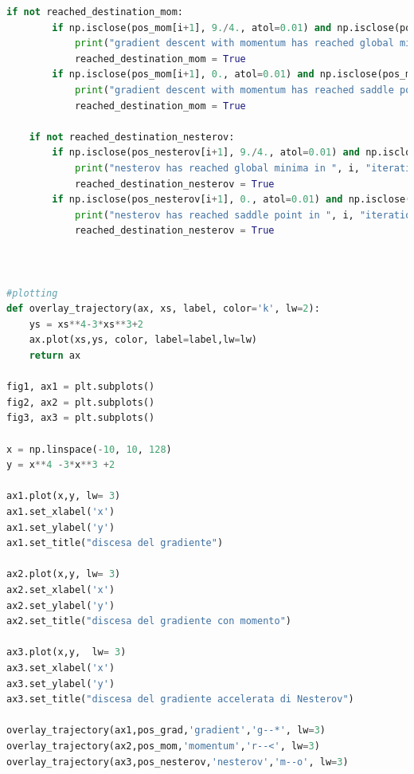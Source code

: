\documentclass{article}
\begin{document}
\begin{lstlisting}[language = Python]
    if not reached_destination_mom:
        if np.isclose(pos_mom[i+1], 9./4., atol=0.01) and np.isclose(pos_mom[i], 9./4., atol=0.01):
            print("gradient descent with momentum has reached global minima in ", i, "iterations")
            reached_destination_mom = True
        if np.isclose(pos_mom[i+1], 0., atol=0.01) and np.isclose(pos_mom[i], 0., atol=0.01):
            print("gradient descent with momentum has reached saddle point in ", i, "iterations")
            reached_destination_mom = True

    if not reached_destination_nesterov:
        if np.isclose(pos_nesterov[i+1], 9./4., atol=0.01) and np.isclose(pos_nesterov[i], 9./4., atol=0.01):
            print("nesterov has reached global minima in ", i, "iterations")
            reached_destination_nesterov = True
        if np.isclose(pos_nesterov[i+1], 0., atol=0.01) and np.isclose(pos_nesterov[i], 0., atol=0.01):
            print("nesterov has reached saddle point in ", i, "iterations")
            reached_destination_nesterov = True



#plotting
def overlay_trajectory(ax, xs, label, color='k', lw=2):
    ys = xs**4-3*xs**3+2
    ax.plot(xs,ys, color, label=label,lw=lw)
    return ax

fig1, ax1 = plt.subplots()
fig2, ax2 = plt.subplots()
fig3, ax3 = plt.subplots()

x = np.linspace(-10, 10, 128)
y = x**4 -3*x**3 +2

ax1.plot(x,y, lw= 3)
ax1.set_xlabel('x')
ax1.set_ylabel('y')
ax1.set_title("discesa del gradiente")

ax2.plot(x,y, lw= 3)
ax2.set_xlabel('x')
ax2.set_ylabel('y')
ax2.set_title("discesa del gradiente con momento")

ax3.plot(x,y,  lw= 3)
ax3.set_xlabel('x')
ax3.set_ylabel('y')
ax3.set_title("discesa del gradiente accelerata di Nesterov")

overlay_trajectory(ax1,pos_grad,'gradient','g--*', lw=3)
overlay_trajectory(ax2,pos_mom,'momentum','r--<', lw=3)
overlay_trajectory(ax3,pos_nesterov,'nesterov','m--o', lw=3)
\end{lstlisting}
\end{document}
